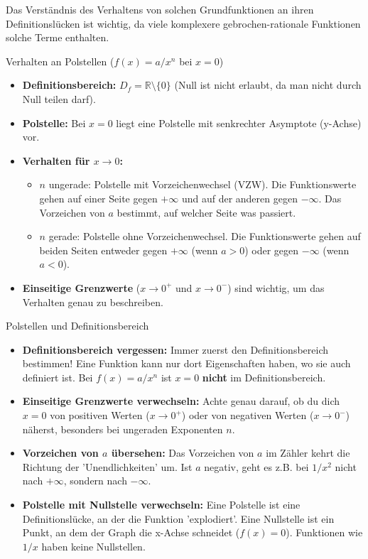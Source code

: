 Das Verständnis des Verhaltens von solchen Grundfunktionen an ihren Definitionslücken ist wichtig, da viele komplexere gebrochen-rationale Funktionen solche Terme enthalten.

\begin{kurzknappumgebung}{Verhalten an Polstellen ($f(x)=a/x^n$ bei $x=0$)}
\begin{itemize}
    \item \textbf{Definitionsbereich:} $D_f = \mathbb{R} \setminus \{0\}$ (Null ist nicht erlaubt, da man nicht durch Null teilen darf).
    \item \textbf{Polstelle:} Bei $x=0$ liegt eine Polstelle mit senkrechter Asymptote (y-Achse) vor.
    \item \textbf{Verhalten für $x \to 0$:}
        \begin{itemize}
            \item $n$ ungerade: Polstelle mit Vorzeichenwechsel (VZW). Die Funktionswerte gehen auf einer Seite gegen $+\infty$ und auf der anderen gegen $-\infty$. Das Vorzeichen von $a$ bestimmt, auf welcher Seite was passiert.
            \item $n$ gerade: Polstelle ohne Vorzeichenwechsel. Die Funktionswerte gehen auf beiden Seiten entweder gegen $+\infty$ (wenn $a>0$) oder gegen $-\infty$ (wenn $a<0$).
        \end{itemize}
    \item \textbf{Einseitige Grenzwerte} ($x \to 0^+$ und $x \to 0^-$) sind wichtig, um das Verhalten genau zu beschreiben.
\end{itemize}
\end{kurzknappumgebung}

\begin{fehlerboxumgebung}{Polstellen und Definitionsbereich}
\begin{itemize}
    \item \textbf{Definitionsbereich vergessen:} Immer zuerst den Definitionsbereich bestimmen! Eine Funktion kann nur dort Eigenschaften haben, wo sie auch definiert ist. Bei $f(x)=a/x^n$ ist $x=0$ \textbf{nicht} im Definitionsbereich.
    \item \textbf{Einseitige Grenzwerte verwechseln:} Achte genau darauf, ob du dich $x=0$ von positiven Werten ($x \to 0^+$) oder von negativen Werten ($x \to 0^-$) näherst, besonders bei ungeraden Exponenten $n$.
    \item \textbf{Vorzeichen von $a$ übersehen:} Das Vorzeichen von $a$ im Zähler kehrt die Richtung der 'Unendlichkeiten' um. Ist $a$ negativ, geht es z.B. bei $1/x^2$ nicht nach $+\infty$, sondern nach $-\infty$.
    \item \textbf{Polstelle mit Nullstelle verwechseln:} Eine Polstelle ist eine Definitionslücke, an der die Funktion 'explodiert'. Eine Nullstelle ist ein Punkt, an dem der Graph die x-Achse schneidet ($f(x)=0$). Funktionen wie $1/x$ haben keine Nullstellen.
\end{itemize}
\end{fehlerboxumgebung}

